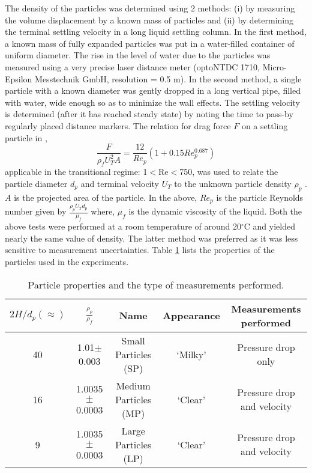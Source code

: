 \documentclass{jfm}
\begin{document}
The density of the particles was determined using 2 methods: (i) by measuring the volume displacement by a known mass of particles and (ii) by determining the terminal settling velocity in a long liquid settling column. In the first method, a known mass of fully expanded particles was put in a water-filled container of uniform diameter. The rise in the level of water due to the particles was measured using a very precise laser distance meter (optoNTDC 1710, Micro-Epsilon Messtechnik GmbH, resolution = 0.5 \textmugreek m). In the second method, a single particle with a known diameter was gently dropped in a long vertical pipe, filled with water, wide enough  
so as to minimize the wall effects. The settling velocity is determined (after it has reached steady state) by noting the time to pass-by regularly placed distance markers. 
The relation for drag force $F$ on a settling particle
in \cite{crowe2011multiphase},
\begin{equation}
  \frac{F}{\rho_{f}U_{T}^2A}=\frac{12}{Re_{p}}(1+0.15Re_{p}^{0.687})
  \label{eqn:Particle density}
\end{equation} applicable in the transitional regime: 1$<$Re$<$750, 
was used to relate the particle diameter $d_p$ and terminal velocity $U_T$ to the unknown particle density $\rho_{p}$ . $A$ is the projected area of the particle. 
In the above, $Re_p$ is the particle Reynolds number given by $\frac{\rho_{p}U_{T}d_{p}}{\mu_f}$ where, ${\mu_f}$ is the dynamic viscosity of the liquid. Both the above tests were performed at a room temperature of around 20$^\circ$C and yielded nearly the same value of density. 
The latter method was preferred as it was less sensitive to measurement uncertainties.
Table \ref{tab:Particle property} lists the properties of the particles used in the experiments. 


\begin{table}
 \begin{center}
  \begin{tabular}{ccccc}
    $2H/d_{p}(\approx)$ & $\frac{\rho_{p}}{\rho_{f}}$ & Name & Appearance & Measurements performed\\[3pt]
    \hline
       40 & 1.01$\pm$0.003 & Small Particles (SP) & `Milky' & Pressure drop only\\
       16 & 1.0035$\pm$0.0003 & Medium Particles (MP) & `Clear' & Pressure drop and velocity\\
       9 & 1.0035$\pm$0.0003 & Large Particles (LP) & `Clear' & Pressure drop and velocity\\
  \end{tabular}
  \caption{Particle properties and the type of measurements performed.}{\label{tab:Particle property}}
 \end{center}
\end{table}
\end{document}
